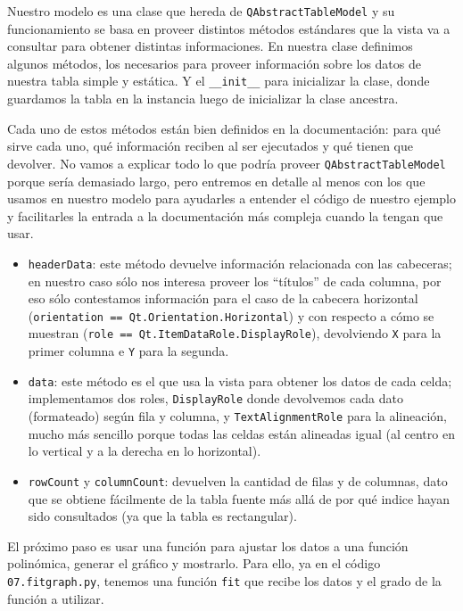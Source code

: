 
Nuestro modelo es una clase que hereda de \texttt{QAbstractTableModel} y su funcionamiento se basa en proveer distintos métodos estándares que la vista va a consultar para obtener distintas informaciones. En nuestra clase definimos algunos métodos, los necesarios para proveer información sobre los datos de nuestra tabla simple y estática. Y el \texttt{\_\_init\_\_} para inicializar la clase, donde guardamos la tabla en la instancia luego de inicializar la clase ancestra.

Cada uno de estos métodos están bien definidos en la documentación: para qué sirve cada uno, qué información reciben al ser ejecutados y qué tienen que devolver. No vamos a explicar todo lo que podría proveer \texttt{QAbstractTableModel} porque sería demasiado largo, pero entremos en detalle al menos con los que usamos en nuestro modelo para ayudarles a entender el código de nuestro ejemplo y facilitarles la entrada a la documentación más compleja cuando la tengan que usar.

\begin{itemize}
    \item \texttt{headerData}: este método devuelve información relacionada con las cabeceras; en nuestro caso sólo nos interesa proveer los ``títulos'' de cada columna, por eso sólo contestamos información para el caso de la cabecera horizontal (\texttt{orientation == Qt.Orientation.Horizontal}) y con respecto a cómo se muestran (\texttt{role == Qt.ItemDataRole.DisplayRole}), devolviendo \texttt{X} para la primer columna e \texttt{Y} para la segunda.
    \item \texttt{data}: este método es el que usa la vista para obtener los datos de cada celda; implementamos dos roles, \texttt{DisplayRole} donde devolvemos cada dato (formateado) según fila y columna, y \texttt{TextAlignmentRole} para la alineación, mucho más sencillo porque todas las celdas están alineadas igual (al centro en lo vertical y a la derecha en lo horizontal).
    \item \texttt{rowCount} y  \texttt{columnCount}: devuelven la cantidad de filas y de columnas, dato que se obtiene fácilmente de la tabla fuente más allá de por qué indice hayan sido consultados (ya que la tabla es rectangular).
\end{itemize}

El próximo paso es usar una función para ajustar los datos a una función polinómica, generar el gráfico y mostrarlo. Para ello, ya en el código \texttt{07.fitgraph.py}, tenemos una función \texttt{fit} que recibe los datos y el grado de la función a utilizar.

